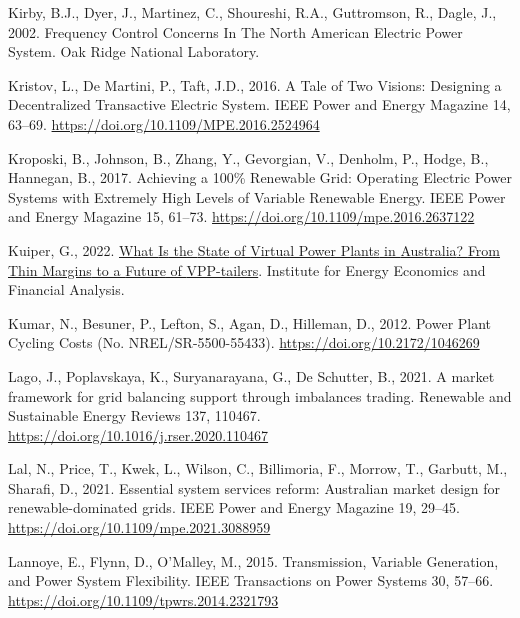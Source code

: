 \documentclass[12pt,a4paper,]{report}
\newlength{\cslhangindent}
\newenvironment{CSLReferences}[2] %
 {%
  \setlength{\parindent}{0pt}
  \ifodd #1 \everypar{\setlength{\hangindent}{\cslhangindent}}\ignorespaces\fi
  \ifnum #2 > 0
  \setlength{\parskip}{#2\baselineskip}
  \fi
 }%
 {}
\begin{document}
\begin{CSLReferences}{1}{0}
\leavevmode{}%
Kirby, B.J., Dyer, J., Martinez, C., Shoureshi, R.A., Guttromson, R.,
Dagle, J., 2002. Frequency {Control Concerns In The North American
Electric Power System}. {Oak Ridge National Laboratory}.

\leavevmode{}%
Kristov, L., De Martini, P., Taft, J.D., 2016. A {Tale} of {Two
Visions}: {Designing} a {Decentralized Transactive Electric System}.
IEEE Power and Energy Magazine 14, 63--69.
\url{https://doi.org/10.1109/MPE.2016.2524964}

\leavevmode{}%
Kroposki, B., Johnson, B., Zhang, Y., Gevorgian, V., Denholm, P., Hodge,
B., Hannegan, B., 2017. Achieving a 100\% {Renewable Grid}: {Operating
Electric Power Systems} with {Extremely High Levels} of {Variable
Renewable Energy}. IEEE Power and Energy Magazine 15, 61--73.
\url{https://doi.org/10.1109/mpe.2016.2637122}

\leavevmode{}%
Kuiper, G., 2022.
\href{https://ieefa.org/wp-content/uploads/2022/03/What-Is-the-State-of-Virtual-Power-Plants-in-Australia_March-2022_2.pdf}{What
{Is} the {State} of {Virtual Power Plants} in {Australia}? {From Thin
Margins} to a {Future} of {VPP-tailers}}. {Institute for Energy
Economics and Financial Analysis}.

\leavevmode{}%
Kumar, N., Besuner, P., Lefton, S., Agan, D., Hilleman, D., 2012. Power
{Plant Cycling Costs} (No. NREL/SR-5500-55433).
\url{https://doi.org/10.2172/1046269}

\leavevmode{}%
Lago, J., Poplavskaya, K., Suryanarayana, G., De Schutter, B., 2021. A
market framework for grid balancing support through imbalances trading.
Renewable and Sustainable Energy Reviews 137, 110467.
\url{https://doi.org/10.1016/j.rser.2020.110467}

\leavevmode{}%
Lal, N., Price, T., Kwek, L., Wilson, C., Billimoria, F., Morrow, T.,
Garbutt, M., Sharafi, D., 2021. Essential system services reform:
{Australian} market design for renewable-dominated grids. IEEE Power and
Energy Magazine 19, 29--45.
\url{https://doi.org/10.1109/mpe.2021.3088959}

\leavevmode{}%
Lannoye, E., Flynn, D., O'Malley, M., 2015. Transmission, {Variable
Generation}, and {Power System Flexibility}. IEEE Transactions on Power
Systems 30, 57--66. \url{https://doi.org/10.1109/tpwrs.2014.2321793}


\end{CSLReferences}
\end{document}
